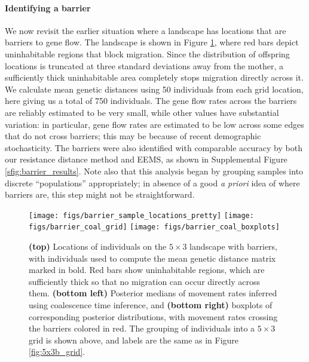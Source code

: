 \documentclass{article}
\begin{document}
\paragraph{Identifying a barrier}
We now revisit the earlier situation where a landscape has locations that are barriers to gene flow.
The landscape is shown in Figure \ref{fig:5x3b_continuous},
where red bars depict uninhabitable regions that block migration.
Since the distribution of offspring locations is truncated at three standard deviations
away from the mother, a sufficiently thick uninhabitable area completely stops migration
directly across it.
We calculate mean genetic distances using 50 individuals 
from each grid location,
here giving us a total of 750 individuals.
The gene flow rates across the barriers are reliably estimated to be very small,
while other values have substantial variation:
in particular, gene flow rates are estimated to be low
across some edges that do not cross barriers;
this may be because of recent demographic stochasticity.
The barriers were also identified with comparable accuracy by both our resistance distance method
and EEMS, as shown in Supplemental Figure \ref{sfig:barrier_results}.
Note also that this analysis began by grouping samples into discrete ``populations'' appropriately;
in absence of a good \textit{a priori} idea of where barriers are,
this step might not be straightforward.

\begin{figure}
\centering
     \texttt{[image: figs/barrier\_sample\_locations\_pretty]}
     \texttt{[image: figs/barrier\_coal\_grid]}
     \texttt{[image: figs/barrier\_coal\_boxplots]}
    \caption{
        \textbf{(top)}
        Locations of individuals on the $5 \times 3$ landscape with barriers,
        with individuals used to compute the mean genetic distance matrix marked in bold.
        Red bars show uninhabitable regions,
        which are sufficiently thick so that no migration can occur directly across them.
        \textbf{(bottom left)}
        Posterior medians of movement rates inferred using coalescence time inference,
        and \textbf{(bottom right)}
        boxplots of corresponding posterior distributions,
        with movement rates crossing the barriers colored in red.
        The grouping of individuals into a $5 \times 3$ grid is shown above,
        and labels are the same as in Figure \ref{fig:5x3b_grid}.
    \label{fig:5x3b_continuous}
    }
\end{figure}
\end{document}
